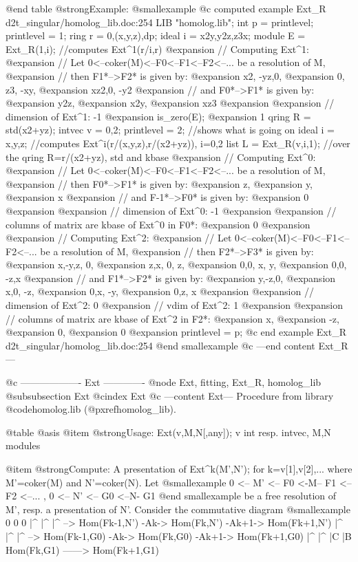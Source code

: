 @end table
@strong{Example:}
@smallexample
@c computed example Ext_R d2t_singular/homolog_lib.doc:254 
LIB "homolog.lib";
int p      = printlevel;
printlevel = 1;
ring r     = 0,(x,y,z),dp;
ideal i    = x2y,y2z,z3x;
module E   = Ext_R(1,i);    //computes Ext^1(r/i,r)
@expansion{} // Computing Ext^1:
@expansion{} // Let 0<--coker(M)<--F0<--F1<--F2<--... be a resolution of M,
@expansion{} // then F1*-->F2* is given by:
@expansion{} x2, -yz,0,  
@expansion{} 0,  z3, -xy,
@expansion{} xz2,0,  -y2 
@expansion{} // and F0*-->F1* is given by:
@expansion{} y2z,
@expansion{} x2y,
@expansion{} xz3 
@expansion{} 
@expansion{} // dimension of Ext^1:  -1
@expansion{} 
is_zero(E);
@expansion{} 1
qring R    = std(x2+yz);
intvec v   = 0,2;
printlevel = 2;             //shows what is going on
ideal i    = x,y,z;         //computes Ext^i(r/(x,y,z),r/(x2+yz)), i=0,2
list L     = Ext_R(v,i,1);  //over the qring R=r/(x2+yz), std and kbase
@expansion{} // Computing Ext^0:
@expansion{} // Let 0<--coker(M)<--F0<--F1<--F2<--... be a resolution of M,
@expansion{} // then F0*-->F1* is given by:
@expansion{} z,
@expansion{} y,
@expansion{} x 
@expansion{} // and F-1*-->F0* is given by:
@expansion{} 0
@expansion{} 
@expansion{} // dimension of Ext^0:  -1
@expansion{} 
@expansion{} // columns of matrix are kbase of Ext^0 in F0*:
@expansion{} 0
@expansion{} 
@expansion{} // Computing Ext^2:
@expansion{} // Let 0<--coker(M)<--F0<--F1<--F2<--... be a resolution of M,
@expansion{} // then F2*-->F3* is given by:
@expansion{} x,-y,z, 0,
@expansion{} z,x, 0, z,
@expansion{} 0,0, x, y,
@expansion{} 0,0, -z,x 
@expansion{} // and F1*-->F2* is given by:
@expansion{} y,-z,0, 
@expansion{} x,0, -z,
@expansion{} 0,x, -y,
@expansion{} 0,z, x  
@expansion{} 
@expansion{} // dimension of Ext^2:  0
@expansion{} // vdim of Ext^2:       1
@expansion{} 
@expansion{} // columns of matrix are kbase of Ext^2 in F2*:
@expansion{} x, 
@expansion{} -z,
@expansion{} 0, 
@expansion{} 0  
@expansion{} 
printlevel = p;
@c end example Ext_R d2t_singular/homolog_lib.doc:254
@end smallexample
@c ---end content Ext_R---

@c ------------------- Ext -------------
@node Ext, fitting, Ext_R, homolog_lib
@subsubsection Ext
@cindex Ext
@c ---content Ext---
Procedure from library @code{homolog.lib} (@pxref{homolog_lib}).

@table @asis
@item @strong{Usage:}
Ext(v,M,N[,any]); v int resp. intvec, M,N modules

@item @strong{Compute:}
A presentation of Ext^k(M',N'); for k=v[1],v[2],... where
M'=coker(M) and N'=coker(N). Let
@smallexample
       0 <-- M' <-- F0 <-M-- F1 <-- F2 <--... ,   
       0 <-- N' <-- G0 <--N- G1
@end smallexample
be a free resolution of M', resp. a presentation of N'. Consider
the commutative diagram
@smallexample
           0                  0                  0
           |^                 |^                 |^
   --> Hom(Fk-1,N') -Ak-> Hom(Fk,N') -Ak+1-> Hom(Fk+1,N')
           |^                 |^                 |^
   --> Hom(Fk-1,G0) -Ak-> Hom(Fk,G0) -Ak+1-> Hom(Fk+1,G0)
                              |^                 |^
                              |C                 |B
                          Hom(Fk,G1) ------> Hom(Fk+1,G1)

